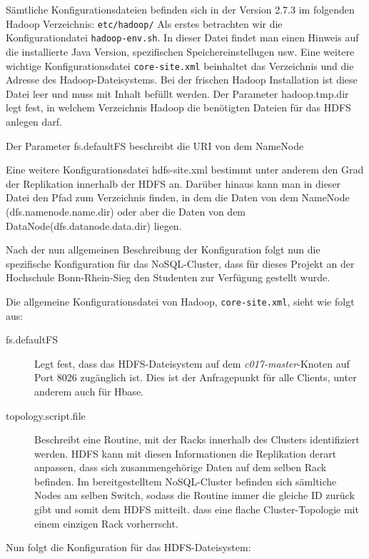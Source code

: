 Sämtliche Konfigurationsdateien befinden sich in der Version 2.7.3 im folgenden Hadoop Verzeichnis: \texttt{etc/hadoop/}
Als erstes betrachten wir die Konfigurationdatei \texttt{hadoop-env.sh}. In dieser Datei findet man einen Hinweis auf die installierte Java Version, spezifischen Speichereinstellugen usw. 
Eine weitere wichtige Konfigurationsdatei \texttt{core-site.xml} beinhaltet das Verzeichnis und die Adresse des Hadoop-Dateisystems. Bei der frischen Hadoop Installation ist diese Datei leer und muss mit Inhalt befüllt werden.
Der Parameter hadoop.tmp.dir legt fest, in welchem Verzeichnis Hadoop die benötigten Dateien für das HDFS anlegen darf.

Der Parameter fs.defaultFS beschreibt die URI von dem NameNode

Eine weitere Konfigurationsdatei hdfs-site.xml bestimmt unter anderem den Grad der Replikation innerhalb der HDFS an.
Darüber hinaus kann man in dieser Datei den Pfad zum Verzeichnis finden, in dem die Daten von dem NameNode (dfs.namenode.name.dir) oder aber die Daten von dem DataNode(dfs.datanode.data.dir) liegen.

Nach der nun allgemeinen Beschreibung der Konfiguration folgt nun die spezifische Konfiguration für das NoSQL-Cluster, dass für
dieses Projekt an der Hochschule Bonn-Rhein-Sieg den Studenten zur Verfügung gestellt wurde.

Die allgemeine Konfigurationsdatei von Hadoop, \texttt{core-site.xml}, sieht wie folgt aus:
\lstset{basicstyle=\small}


\begin{description}
	\item[fs.defaultFS] Legt fest, dass das HDFS-Dateisystem auf dem \textit{c017-master}-Knoten auf Port $8026$ zugänglich ist.
	Dies ist der Anfragepunkt für alle Clients, unter anderem auch für Hbase.
	\item[topology.script.file] Beschreibt eine Routine, mit der Racks innerhalb des Clusters identifiziert werden. HDFS kann mit diesen
	Informationen die Replikation derart anpassen, dass sich zusammengehörige Daten auf dem selben Rack befinden. Im bereitgestelltem
	NoSQL-Cluster befinden sich sämltiche Nodes am selben Switch, sodass die Routine immer die gleiche ID zurück gibt
	und somit dem HDFS mitteilt. dass eine flache Cluster-Topologie mit einem einzigen Rack vorherrscht.
\end{description}

Nun folgt die Konfiguration für das HDFS-Dateisystem:
\lstset{basicstyle=\small}


